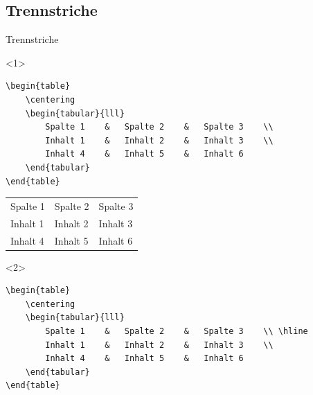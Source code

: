 \documentclass["WS\space 16-17\space -\space LaTeX-Kurs\space -\space Praesentation\space -\space 2.tex"]{subfiles}
\begin{document}
\subsection{Trennstriche}
\begin{frame}[c]
	\begin{center}
		\large Trennstriche
	\end{center}
\end{frame}
\begin{frame}[fragile]
	\begin{onlyenv}
		\Code
		\begin{lstlisting}
\begin{table}
	\centering
	\begin{tabular}{lll}
		Spalte 1	&	Spalte 2	&	Spalte 3	\\
		Inhalt 1	&	Inhalt 2	&	Inhalt 3	\\
		Inhalt 4	&	Inhalt 5	&	Inhalt 6	
	\end{tabular}
\end{table}
		\end{lstlisting}
		\Ausgabe
		\begin{outputbox}
			\begin{table}
				\centering
				\begin{tabular}{lll}
					Spalte 1	&	Spalte 2	&	Spalte 3	\\
					Inhalt 1	&	Inhalt 2	&	Inhalt 3	\\
					Inhalt 4	&	Inhalt 5	&	Inhalt 6	
				\end{tabular}
			\end{table}
		\end{outputbox}
	\end{onlyenv}
	\begin{onlyenv}
		\Code
		\begin{lstlisting}
\begin{table}
	\centering
	\begin{tabular}{lll}
		Spalte 1	&	Spalte 2	&	Spalte 3	\\ \hline
		Inhalt 1	&	Inhalt 2	&	Inhalt 3	\\
		Inhalt 4	&	Inhalt 5	&	Inhalt 6	
	\end{tabular}
\end{table}
		\end{lstlisting}

\end{onlyenv}
\end{frame}
\end{document}
